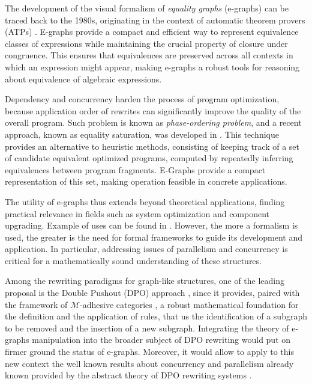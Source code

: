 The development of the visual formalism of \emph{equality graphs} (e-graphs) can be traced back to the 1980s, originating in the context of automatic theorem provers (ATPs) \cite{Nelson1980}. 
E-graphs provide a compact and efficient way to represent equivalence classes of expressions while maintaining the crucial property of closure under congruence. 
This ensures that equivalences are preserved across all contexts in which an expression might appear, making e-graphs a robust tools for reasoning about equivalence of algebraic expressions.

Dependency and concurrency harden the process of program optimization, because application order of rewrites can significantly improve the quality of the overall program.
Such problem is known as \textit{phase-ordering problem}, and a recent approach, known as equality saturation, was developed in \cite{Tate_2011}.
This technique provides an alternative to heuristic methods, consisting of keeping track of a set of candidate equivalent optimized programs, 
computed by repeatedly inferring equivalences between program fragments.
E-Graphs provide a compact representation of this set, making operation feasible in concrete applications.

The utility of e-graphs thus extends beyond theoretical applications, finding practical relevance in fields such as system optimization and component upgrading. Example of uses can be found in \cite{Cheli2021}.
%
However, the more a formalism is used, the greater is the need for formal frameworks to guide its development and application. In particular, addressing issues of parallelism and concurrency is critical for 
a mathematically 
sound understanding of these structures.

Among the rewriting paradigms for graph-like structures, one of the leading proposal is the Double Pushout (DPO) approach \cite{Ehrig_Golas,ehrig2006fundamentals}, since it provides, paired with the framework of $\mathcal{M}$-adhesive  categories \cite{lack2005adhesive,azzi2019essence,behr2022fundamentals}, a robust mathematical foundation for the definition and the application of rules,
that us the identification of a subgraph to be removed and the insertion of a new subgraph.
%
Integrating the theory of e-graphs manipulation into the broader subject of DPO rewriting would put on firmer ground the status of e-graphs. Moreover, it would allow to apply to this new context the well known results about concurrency and parallelism already known provided by the abstract theory of DPO rewriting systems \cite{baldan1999concurrent,ehrig1999handbook}. 
 
